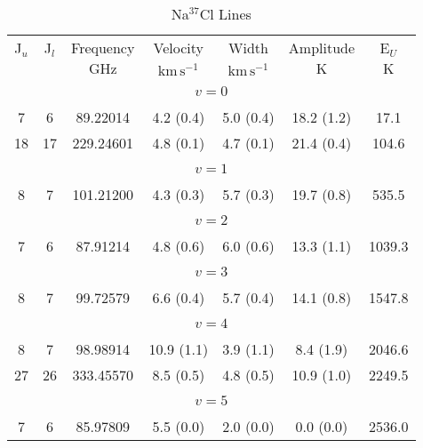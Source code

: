 \begin{table*}[htp]
\centering
\caption{Na$^{37}$Cl Lines}
\begin{tabular}{ccccccc}
\label{tab:Na37Cl_salt_lines}
 J$_u$ & J$_l$ & Frequency & Velocity & Width & Amplitude & E$_U$ \\
  &  & $\mathrm{GHz}$ & $\mathrm{km\,s^{-1}}$ & $\mathrm{km\,s^{-1}}$ & $\mathrm{K}$ & $\mathrm{K}$ \\
\hline
&\vspace{-0.75em}\\
\multicolumn{7}{c}{$v = 0$} \\
\vspace{-0.75em}\\
 7 & 6 & 89.22014 & 4.2 (0.4) & 5.0 (0.4) & 18.2 (1.2) & 17.1 \\
 18 & 17 & 229.24601 & 4.8 (0.1) & 4.7 (0.1) & 21.4 (0.4) & 104.6 \\
&\vspace{-0.75em}\\
\multicolumn{7}{c}{$v = 1$} \\
\vspace{-0.75em}\\
 8 & 7 & 101.21200 & 4.3 (0.3) & 5.7 (0.3) & 19.7 (0.8) & 535.5 \\
&\vspace{-0.75em}\\
\multicolumn{7}{c}{$v = 2$} \\
\vspace{-0.75em}\\
 7 & 6 & 87.91214 & 4.8 (0.6) & 6.0 (0.6) & 13.3 (1.1) & 1039.3 \\
&\vspace{-0.75em}\\
\multicolumn{7}{c}{$v = 3$} \\
\vspace{-0.75em}\\
 8 & 7 & 99.72579 & 6.6 (0.4) & 5.7 (0.4) & 14.1 (0.8) & 1547.8 \\
&\vspace{-0.75em}\\
\multicolumn{7}{c}{$v = 4$} \\
\vspace{-0.75em}\\
 8 & 7 & 98.98914 & 10.9 (1.1) & 3.9 (1.1) & 8.4 (1.9) & 2046.6 \\
 27 & 26 & 333.45570 & 8.5 (0.5) & 4.8 (0.5) & 10.9 (1.0) & 2249.5 \\
\hline
&\vspace{-0.75em}\\
\multicolumn{7}{c}{$v = 5$} \\
\vspace{-0.75em}\\
 7 & 6 & 85.97809 & 5.5 (0.0) & 2.0 (0.0) & 0.0 (0.0) & 2536.0 \\
\end{tabular}

\par 
\end{table*}
